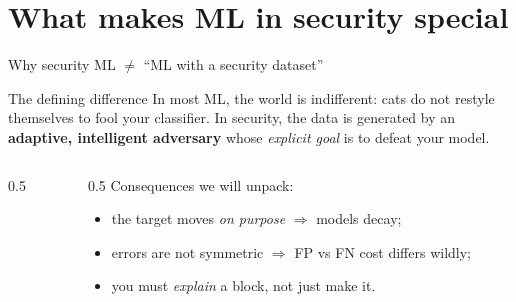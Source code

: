 \documentclass[aspectratio=169,10pt]{beamer}
\newcommand{\term}[1]{{\color{mlink}\textbf{#1}}}         %
\begin{document}
\section{What makes ML in security special}

\begin{frame}{Why security ML $\neq$ ``ML with a security dataset''}
  \begin{block}{\small The defining difference}
    \small In most ML, the world is indifferent: cats do not restyle themselves to
    fool your classifier. In security, the data is generated by an \term{adaptive,
    intelligent adversary} whose \emph{explicit goal} is to defeat your model.
  \end{block}
  \vspace{0.3em}
  \begin{columns}[T]
    \begin{column}{0.5\textwidth}
    \end{column}
    \begin{column}{0.5\textwidth}
      \small Consequences we will unpack:
      \begin{itemize}\setlength\itemsep{1pt}
        \item the target moves \emph{on purpose} $\Rightarrow$ models decay;
        \item errors are not symmetric $\Rightarrow$ FP vs FN cost differs wildly;
        \item you must \emph{explain} a block, not just make it.
      \end{itemize}
    \end{column}
  \end{columns}
\end{frame}
\end{document}
